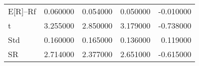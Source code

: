 \begin{tabular}{lrrrr}
\toprule
\midrule
E[R]--Rf & 0.060000 & 0.054000 & 0.050000 & -0.010000 \\
t & 3.255000 & 2.850000 & 3.179000 & -0.738000 \\
Std & 0.160000 & 0.165000 & 0.136000 & 0.119000 \\
SR & 2.714000 & 2.377000 & 2.651000 & -0.615000 \\
\bottomrule
\end{tabular}
